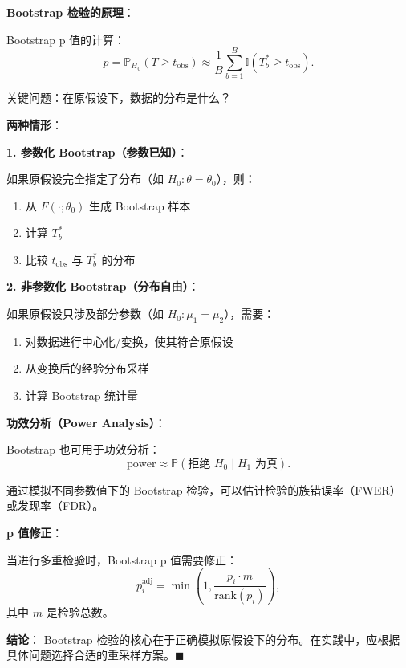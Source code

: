 \textbf{Bootstrap 检验的原理}：

Bootstrap p 值的计算：
\[
 p = \mathbb{P}_{H_0}(T \geqslant t_{\text{obs}}) \approx \frac{1}{B} \sum_{b=1}^B \mathbb{I}(T^*_b \geqslant t_{\text{obs}}).
\]

关键问题：在原假设下，数据的分布是什么？

\textbf{两种情形}：

\textbf{1. 参数化 Bootstrap（参数已知）}：

如果原假设完全指定了分布（如 $H_0: \theta = \theta_0$），则：
\begin{enumerate}
\item 从 $F(\cdot; \theta_0)$ 生成 Bootstrap 样本
\item 计算 $T^*_b$
\item 比较 $t_{\text{obs}}$ 与 $T^*_b$ 的分布
\end{enumerate}

\textbf{2. 非参数化 Bootstrap（分布自由）}：

如果原假设只涉及部分参数（如 $H_0: \mu_1 = \mu_2$），需要：
\begin{enumerate}
\item 对数据进行中心化/变换，使其符合原假设
\item 从变换后的经验分布采样
\item 计算 Bootstrap 统计量
\end{enumerate}

\textbf{功效分析（Power Analysis）}：

Bootstrap 也可用于功效分析：
\[
\text{power} \approx \mathbb{P}\left( \text{拒绝 } H_0 \mid H_1 \text{ 为真} \right).
\]

通过模拟不同参数值下的 Bootstrap 检验，可以估计检验的族错误率（FWER）或发现率（FDR）。

\textbf{p 值修正}：

当进行多重检验时，Bootstrap p 值需要修正：
\[
p_i^{\text{adj}} = \min\left( 1, \frac{p_i \cdot m}{\text{rank}(p_i)} \right),
\]
其中 $m$ 是检验总数。

\textbf{结论}：
Bootstrap 检验的核心在于正确模拟原假设下的分布。在实践中，应根据具体问题选择合适的重采样方案。$\blacksquare$
